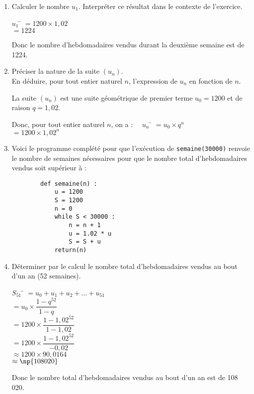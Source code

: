 \documentclass[a4paper,11pt,exos]{nsi}
\begin{document}
\begin{enumerate}
\item Calculer le nombre $u_1$. Interpréter ce résultat dans le contexte de l'exercice.
\textcolor{UGLiBlue}{
    \begin{tabbing}
        $u_1$   \= $= 1200 \times 1,02$\\
        \> $= 1224$
    \end{tabbing}
    Donc le nombre d'hebdomadaires vendus durant la deuxième semaine est de 1224.
}
\item Préciser la nature de la suite $(u_n)$.\\
En déduire, pour tout entier naturel $n$, l'expression de $u_n$ en fonction de $n$.\\[.5em]
\textcolor{UGLiBlue}{
    La suite $(u_n)$ est une suite géométrique de premier terme $u_0 = 1200$ et de raison $q = 1,02$.
    \begin{tabbing}
        Donc, pour tout entier naturel $n$, on a : $\quad u_n$ \= $= u_0 \times q^n$\\
        \> $= 1200 \times 1,02^n$
    \end{tabbing}
}
\item Voici le programme complété pour que l'exécution de \texttt{semaine(30000)} renvoie le nombre de semaines nécessaires pour que le nombre total d'hebdomadaires vendus soit supérieur à  :

\begin{pyc}
    \begin{verbatim}
        def semaine(n) :
            u = 1200
            S = 1200
            n = 0
            while S < 30000 :
                n = n + 1
                u = 1.02 * u
                S = S + u
            return(n)
    \end{verbatim}
\end{pyc}
\item Déterminer par le calcul le nombre total d'hebdomadaires vendus au bout d'un an (52 semaines).\\[.5em]
\textcolor{UGLiBlue}{
    \begin{tabbing}
        $S_{51}$ \= $=u_0+u_1+u_2+\ldots+u_{51}$\\[.5em]
        \> $= u_0 \times \dfrac{1 - q^{52}}{1 - q}$\\[.5em]
        \> $= 1200 \times \dfrac{1 - 1,02^{52}}{1 - 1,02}$\\[.5em]
        \> $= 1200 \times \dfrac{1 - 1,02^{52}}{-0,02}$\\[.5em]
        \> $\approx 1200 \times 90,0164$\\
        \> $\approx \np{108020}$
    \end{tabbing}
    Donc le nombre total d'hebdomadaires vendus au bout d'un an est de 108 020.
}
\end{enumerate}
\end{document}
